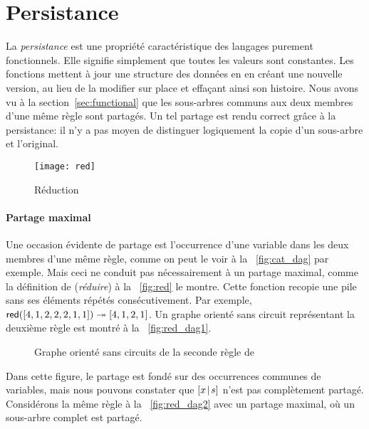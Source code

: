 \section{Persistance}
\label{sec:persistence}

La \emph{persistance} est une propriété
caractéristique des langages purement fonctionnels. Elle signifie
simplement que toutes les valeurs sont constantes. Les fonctions
mettent à jour une structure des données en en créant une nouvelle
version, au lieu de la modifier sur place et effaçant ainsi son
histoire. Nous avons vu à la section~\vref{sec:functional} que les
sous-arbres communs aux deux membres d'une même règle sont partagés.
Un tel partage est rendu correct grâce à la persistance: il n'y a pas
moyen de distinguer logiquement la copie d'un sous-arbre et
l'original.

%
\setlength{\intextsep}{0pt}
\begin{wrapfigure}[6]{r}[0pt]{0pt}
\centering
\texttt{[image: red]}
\caption{Réduction}
\label{fig:red}
\end{wrapfigure}

\paragraph{Partage maximal}

Une occasion évidente de partage est l'occurrence d'une variable dans
les deux membres d'une même règle, comme on peut le voir à la
\fig~\vref{fig:cat_dag} par exemple. Mais ceci ne conduit pas
nécessairement à un partage maximal, comme la définition de
 (\emph{réduire}) à la
\fig~\vref{fig:red} le montre. Cette fonction recopie une pile sans
ses éléments répétés consécutivement. Par exemple,
\(\textsf{red}([4,1,2,2,2,1,1]) \twoheadrightarrow [4,1,2,1]\). Un graphe
orienté sans circuit représentant la deuxième règle est montré à la
\fig~\vref{fig:red_dag1}.
\begin{figure}[b]
\centering
{}
\qquad\qquad
{}
\caption{Graphe orienté sans circuits de la seconde règle de }
\end{figure}
Dans cette figure, le partage est fondé sur des occurrences communes
de variables, mais nous pouvons constater que \([{x}\!\mid\!{s}]\) n'est
pas complètement partagé. Considérons la même règle à la
\fig~\vref{fig:red_dag2} avec un partage maximal, où un sous-arbre
complet est partagé.


